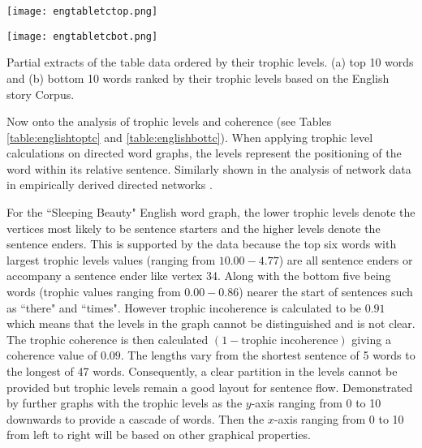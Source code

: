 \begin{table}[!htb]
\centering
\begin{subtable}{.45\textwidth}
	\centering
	\texttt{[image: engtabletctop.png]}
	\caption{}
	\label{table:englishtoptc}
\end{subtable}
\hfill
\begin{subtable}{.45\textwidth}
	\centering
	\texttt{[image: engtabletcbot.png]}
	\caption{}
	\label{table:englishbottc}
\end{subtable}
\caption{Partial extracts of the table data ordered by their trophic levels. (a) top 10 words and (b) bottom 10 words ranked by their trophic levels based on the English story Corpus.}
\end{table}

Now onto the analysis of trophic levels and coherence (see Tables \ref{table:englishtoptc} and \ref{table:englishbottc}). When applying trophic level calculations on directed word graphs, the levels represent the positioning of the word within its relative sentence. Similarly shown in the analysis of network data in empirically derived directed networks \cite{johnson2017looplessness}. 

For the ``Sleeping Beauty" English word graph, the lower trophic levels denote the vertices most likely to be sentence starters and the higher levels denote the sentence enders. This is supported by the data because the top six words with largest trophic levels values (ranging from $10.00-4.77$) are all sentence enders or accompany a sentence ender like vertex 34. Along with the bottom five being words (trophic values ranging from $0.00-0.86$) nearer the start of sentences such as ``there" and ``times". However trophic incoherence is calculated to be $0.91$ which means that the levels in the graph cannot be distinguished and is not clear. The $\text{trophic coherence}$ is then calculated $(1 - \text{trophic incoherence})$ giving a coherence value of $0.09$. The lengths vary from the shortest sentence of 5 words to the longest of 47 words. Consequently, a clear partition in the levels cannot be provided but trophic levels remain a good layout for sentence flow. Demonstrated by further graphs with the trophic levels as the $y$-axis ranging from 0 to 10 downwards to provide a cascade of words. Then the $x$-axis ranging from 0 to 10 from left to right will be based on other graphical properties.

